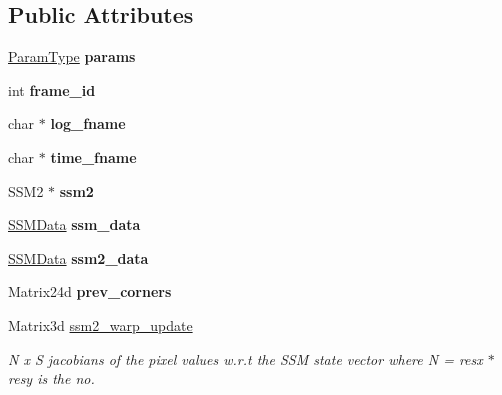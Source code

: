 \subsection*{Public Attributes}
\begin{DoxyCompactItemize}
\item 
\hypertarget{classHESM_a87e59e57ccec4467d7745c2d99219e6e}{\hyperlink{structHESMParams}{Param\-Type} {\bfseries params}}\label{classHESM_a87e59e57ccec4467d7745c2d99219e6e}

\item 
\hypertarget{classHESM_a6c1c00ffbc289e8028529807e8c0da50}{int {\bfseries frame\-\_\-id}}\label{classHESM_a6c1c00ffbc289e8028529807e8c0da50}

\item 
\hypertarget{classHESM_ad8a37b50b1f76c6598e3c76e497d733a}{char $\ast$ {\bfseries log\-\_\-fname}}\label{classHESM_ad8a37b50b1f76c6598e3c76e497d733a}

\item 
\hypertarget{classHESM_a6dba5f327ca9a5a158b62016d19a1708}{char $\ast$ {\bfseries time\-\_\-fname}}\label{classHESM_a6dba5f327ca9a5a158b62016d19a1708}

\item 
\hypertarget{classHESM_a40cfa5c9a331cbc73050639667eb451b}{S\-S\-M2 $\ast$ {\bfseries ssm2}}\label{classHESM_a40cfa5c9a331cbc73050639667eb451b}

\item 
\hypertarget{classHESM_ab2b7017dd86f6c2cebc5e07dba545cb2}{\hyperlink{structSSMData}{S\-S\-M\-Data} {\bfseries ssm\-\_\-data}}\label{classHESM_ab2b7017dd86f6c2cebc5e07dba545cb2}

\item 
\hypertarget{classHESM_ac426f9fe32f637e70f2e2d3d8a59f7de}{\hyperlink{structSSMData}{S\-S\-M\-Data} {\bfseries ssm2\-\_\-data}}\label{classHESM_ac426f9fe32f637e70f2e2d3d8a59f7de}

\item 
\hypertarget{classHESM_a05b53b1bef8dc84572c6e10d9b7bff42}{Matrix24d {\bfseries prev\-\_\-corners}}\label{classHESM_a05b53b1bef8dc84572c6e10d9b7bff42}

\item 
Matrix3d \hyperlink{classHESM_a2528f05cea5cc5c9485a5b31a9b6d092}{ssm2\-\_\-warp\-\_\-update}
\begin{DoxyCompactList}\small\item\em N x S jacobians of the pixel values w.\-r.\-t the S\-S\-M state vector where N = resx $\ast$ resy is the no. \end{DoxyCompactList}\end{DoxyCompactItemize}
